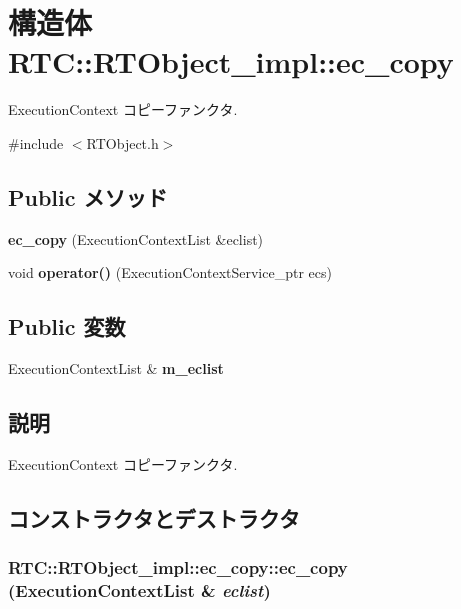 \section{構造体 RTC::RTObject\_\-impl::ec\_\-copy}
\label{structRTC_1_1RTObject__impl_1_1ec__copy}


ExecutionContext コピーファンクタ.  




{\ttfamily \#include $<$RTObject.h$>$}

\subsection*{Public メソッド}
\begin{DoxyCompactItemize}
\item 
{\bf ec\_\-copy} (ExecutionContextList \&eclist)
\item 
void {\bf operator()} (ExecutionContextService\_\-ptr ecs)
\end{DoxyCompactItemize}
\subsection*{Public 変数}
\begin{DoxyCompactItemize}
\item 
ExecutionContextList \& {\bf m\_\-eclist}
\end{DoxyCompactItemize}


\subsection{説明}
ExecutionContext コピーファンクタ. 

\subsection{コンストラクタとデストラクタ}
\subsubsection[{ec\_\-copy}]{\setlength{\rightskip}{0pt plus 5cm}RTC::RTObject\_\-impl::ec\_\-copy::ec\_\-copy (ExecutionContextList \& {\em eclist})\hspace{0.3cm}{\ttfamily  [inline]}}\label{structRTC_1_1RTObject__impl_1_1ec__copy_a673a474c9400970f721ae7829cdfca2d}


